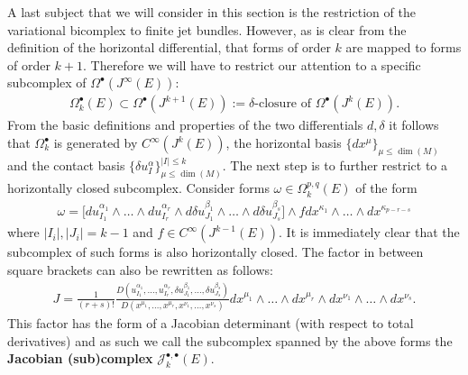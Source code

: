     A last subject that we will consider in this section is the restriction of the variational bicomplex to finite jet bundles. However, as is clear from the definition of the horizontal differential, that forms of order $k$ are mapped to forms of order $k+1$. Therefore we will have to restrict our attention to a specific subcomplex of $\Omega^\bullet(J^\infty(E))$:
    \begin{gather}
        \Omega^\bullet_k(E)\subset\Omega^\bullet(J^{k+1}(E)) := \delta\text{-closure of }\Omega^\bullet(J^k(E)).
    \end{gather}
    From the basic definitions and properties of the two differentials $d,\delta$ it follows that $\Omega^\bullet_k$ is generated by $C^\infty(J^k(E))$, the horizontal basis $\{dx^\mu\}_{\mu\leq\dim(M)}$ and the contact basis $\{\delta u^\alpha_I\}_{\mu\leq\dim(M)}^{|I|\leq k}$.
    The next step is to further restrict to a horizontally closed subcomplex. Consider forms $\omega\in\Omega^{p,q}_k(E)$ of the form
    \begin{gather}
        \omega = \Big[du^{\alpha_1}_{I_1}\wedge\ldots\wedge du^{\alpha_r}_{I_r}\wedge d\delta u^{\beta_1}_{J_1}\wedge\ldots\wedge d\delta u^{\beta_s}_{J_s}\Big]\wedge fdx^{\kappa_1}\wedge\ldots\wedge dx^{\kappa_{p-r-s}}
    \end{gather}
    where $|I_i|,|J_i|=k-1$ and $f\in C^\infty(J^{k-1}(E))$. It is immediately clear that the subcomplex of such forms is also horizontally closed. The factor in between square brackets can also be rewritten as follows:
    \begin{gather}
        J = \frac{1}{(r+s)!}\frac{D(u^{\alpha_1}_{I_1},\ldots,u^{\alpha_r}_{I_r},\delta u^{\beta_1}_{J_1},\ldots,\delta u^{\beta_s}_{J_s})}{D(x^{\mu_1},\ldots,x^{\mu_r},x^{\nu_1},\ldots,x^{\nu_s})} dx^{\mu_1}\wedge\ldots\wedge dx^{\mu_r}\wedge dx^{\nu_1}\wedge\ldots\wedge dx^{\nu_s}.
    \end{gather}
    This factor has the form of a Jacobian determinant (with respect to total derivatives) and as such we call the subcomplex spanned by the above forms the \textbf{Jacobian (sub)complex} $\mathcal{J}^{\bullet,\bullet}_k(E)$.

